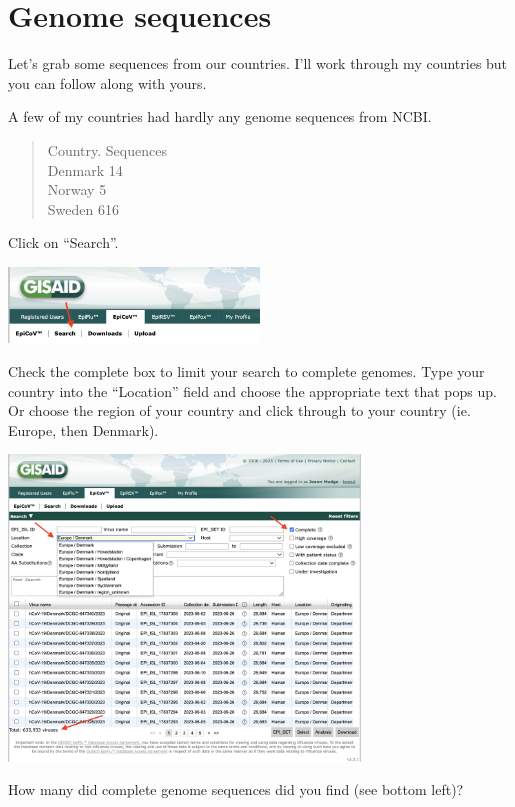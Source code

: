 \documentclass[
]{book}
\begin{document}
\hypertarget{genome-sequences}{%
\section{Genome sequences}\label{genome-sequences}}

Let's grab some sequences from our countries. I'll work through my countries but you can follow along with yours.

A few of my countries had hardly any genome sequences from NCBI.

\begin{quote}
Country. Sequences\\
Denmark 14\\
Norway 5\\
Sweden 616\\
\end{quote}

Click on ``Search''.

\includegraphics[width=0.5\textwidth,height=\textheight]{./Figures/search.png}

Check the complete box to limit your search to complete genomes. Type your country into the ``Location'' field and choose the appropriate text that pops up. Or choose the region of your country and click through to your country (ie. Europe, then Denmark).

\includegraphics[width=0.7\textwidth,height=\textheight]{./Figures/DenmarkSearch.png}

How many did complete genome sequences did you find (see bottom left)?
\end{document}
